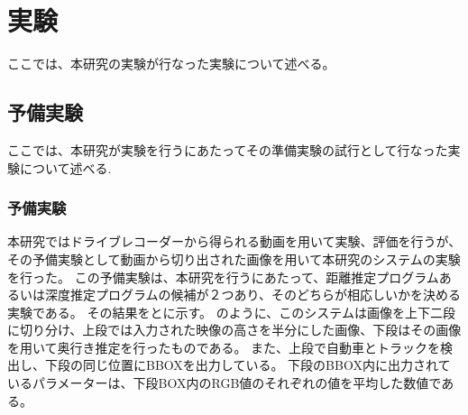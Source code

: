 \chapter{実験}
ここでは、本研究の実験が行なった実験について述べる。

\section{予備実験}
ここでは、本研究が実験を行うにあたってその準備実験の試行として行なった実験について述べる.



\subsection{予備実験}
本研究ではドライブレコーダーから得られる動画を用いて実験、評価を行うが、その予備実験として動画から切り出された画像を用いて本研究のシステムの実験を行った。
この予備実験は、本研究を行うにあたって、距離推定プログラムあるいは深度推定プログラムの候補が２つあり、そのどちらが相応しいかを決める実験である。
その結果をとに示す。
のように、このシステムは画像を上下二段に切り分け、上段では入力された映像の高さを半分にした画像、下段はその画像を用いて奥行き推定を行ったものである。
また、上段で自動車とトラックを検出し、下段の同じ位置にBBOXを出力している。
下段のBBOX内に出力されているパラメーターは、下段BOX内のRGB値のそれぞれの値を平均した数値である。

